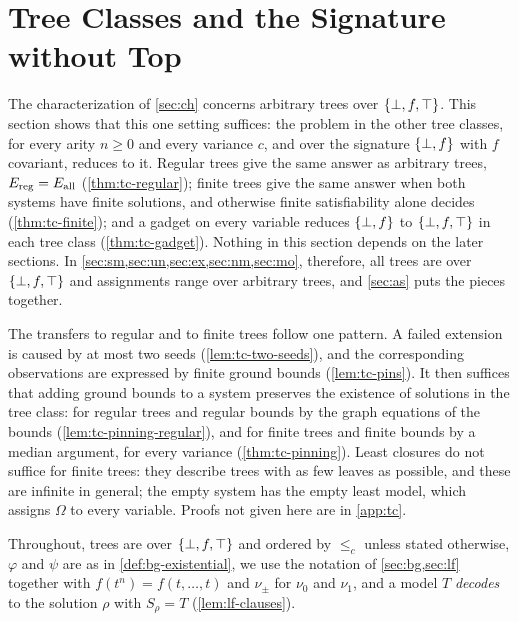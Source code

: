 
\section{Tree Classes and the Signature without Top}\label{sec:tc}\label{sec:classes}

The characterization of \cref{sec:ch} concerns arbitrary trees over $\{\bot,f,\top\}$.
This section shows that this one setting suffices: the problem in the other
tree classes, for every arity $n\ge0$ and every variance $c$, and over the
signature $\{\bot,f\}$ with $f$ covariant, reduces to it. Regular trees give the same
answer as arbitrary trees, $E_{\mathrm{reg}}=E_{\mathrm{all}}$ (\cref{thm:tc-regular}); finite trees
give the same answer when both systems have finite solutions, and otherwise
finite satisfiability alone decides (\cref{thm:tc-finite}); and a gadget on
every variable reduces $\{\bot,f\}$ to $\{\bot,f,\top\}$ in each tree class
(\cref{thm:tc-gadget}). Nothing in this section depends on the later
sections. In \cref{sec:sm,sec:un,sec:ex,sec:nm,sec:mo}, therefore, all trees
are over $\{\bot,f,\top\}$ and assignments range over arbitrary trees, and \cref{sec:as}
puts the pieces together.

The transfers to regular and to finite trees follow one pattern. A failed
extension is caused by at most two seeds (\cref{lem:tc-two-seeds}), and the
corresponding observations are expressed by finite ground bounds
(\cref{lem:tc-pins}). It then suffices that
adding ground bounds to a system preserves the existence of solutions in the
tree class: for regular trees and regular bounds by the graph equations of the
bounds (\cref{lem:tc-pinning-regular}), and for finite trees and finite bounds
by a median argument, for every variance (\cref{thm:tc-pinning}). Least
closures do not suffice for finite trees: they describe trees with as few
leaves as possible, and these are infinite in general; the empty system has
the empty least model, which assigns $\Omega$ to every variable. Proofs not
given here are in \cref{app:tc}.

Throughout, trees are over $\{\bot,f,\top\}$ and ordered by $\le_c$ unless stated
otherwise, $\varphi$ and $\psi$ are as in \cref{def:bg-existential}, we use
the notation of \cref{sec:bg,sec:lf} together with $f(t^n)=f(t,\dots,t)$ and
$\nu_\pm$ for $\nu_0$ and $\nu_1$, and a model $T$ \emph{decodes} to the
solution $\rho$ with $S_\rho=T$ (\cref{lem:lf-clauses}).

